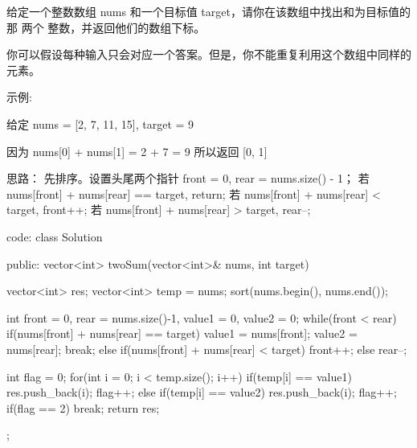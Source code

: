 给定一个整数数组 nums 和一个目标值 target，请你在该数组中找出和为目标值的那 两个 整数，并返回他们的数组下标。

你可以假设每种输入只会对应一个答案。但是，你不能重复利用这个数组中同样的元素。

示例:

给定 nums = [2, 7, 11, 15], target = 9

因为 nums[0] + nums[1] = 2 + 7 = 9
所以返回 [0, 1]



























思路：
先排序。设置头尾两个指针 front = 0, rear = nums.size() - 1；
若 nums[front] + nums[rear] == target, return;
若 nums[front] + nums[rear] < target, front++;
若 nums[front] + nums[rear] > target, rear--;




























code:
class Solution {
public:
    vector<int> twoSum(vector<int>& nums, int target) {
        vector<int> res;
        vector<int> temp = nums;
        sort(nums.begin(), nums.end());
        
        int front = 0, rear = nums.size()-1, value1 = 0, value2 = 0;
        while(front < rear)
        {
            if(nums[front] + nums[rear] == target)
            {
                value1 = nums[front]; value2 = nums[rear]; break;
            }
            else if(nums[front] + nums[rear] < target)
                front++;
            else rear--;
        }
        
        int flag = 0;
        for(int i = 0; i < temp.size(); i++)
        {
            if(temp[i] == value1)
            {
                res.push_back(i); flag++;
            }
            else if(temp[i] == value2)
            {
                res.push_back(i); flag++;
            }
            if(flag == 2) break;
        }
        return res;
    }
};